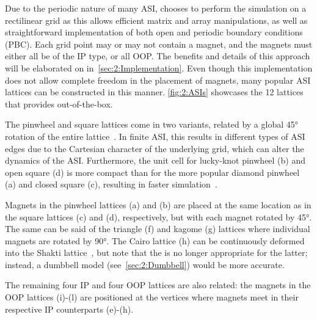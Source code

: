 Due to the periodic nature of many ASI, \hotspice chooses to perform the simulation on a rectilinear grid as this allows efficient matrix and array manipulations, as well as straightforward implementation of both open and periodic boundary conditions (PBC).
Each grid point may or may not contain a magnet, and the magnets must either all be of the IP type, or all OOP.
The benefits and details of this approach will be elaborated on in~\cref{sec:2:Implementation}.
Even though this implementation does not allow complete freedom in the placement of magnets, many popular ASI lattices can be constructed in this manner.
\cref{fig:2:ASIs} showcases the 12 lattices that \hotspice provides out-of-the-box. \par
The pinwheel and square lattices come in two variants, related by a global \ang{45} rotation of the entire lattice~\cite{ApparentFMpinwheel}.
In finite ASI, this results in different types of ASI edges due to the Cartesian character of the underlying grid, which can alter the dynamics of the ASI.
Furthermore, the unit cell for lucky-knot pinwheel (b) and open square (d) is more compact than for the more popular diamond pinwheel (a) and closed square (c), resulting in faster simulation~\cite{AdvancesASI}. \par %
Magnets in the pinwheel lattices (a) and (b) are placed at the same location as in the square lattices (c) and (d), respectively, but with each magnet rotated by \ang{45}.
The same can be said of the triangle (f) and kagome (g) lattices where individual magnets are rotated by \ang{90}.
The Cairo lattice (h) can be continuously deformed into the Shakti lattice~\cite{ShaktiCairo,ShaktiCairoSquare}, but note that the  is no longer appropriate for the latter; instead, a dumbbell model (see~\cref{sec:2:Dumbbell}) would be more accurate. \par
The remaining four IP and four OOP lattices are also related: the magnets in the OOP lattices (i)-(l) are positioned at the vertices where magnets meet in their respective IP counterparts (e)-(h).


